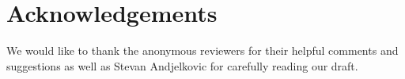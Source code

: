 \documentclass[preprint]{sigplanconf}
\begin{document}
\section*{Acknowledgements}

We would like to thank the anonymous reviewers for their helpful comments and
suggestions as well as Stevan Andjelkovic for carefully reading our draft.








\end{document}
